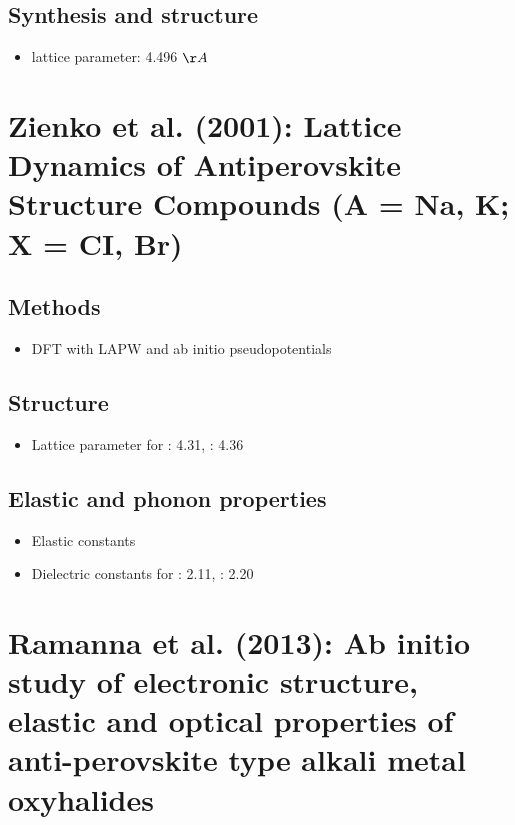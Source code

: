 \documentclass[10pt,a4paper, titlepage]{article}
\begin{document}
\subsection{Synthesis and structure}

\begin{itemize}
  \item {} lattice parameter: 4.496 $\AA$
\end{itemize}

\section{Zienko et al. (2001): Lattice Dynamics of Antiperovskite Structure
Compounds  (A = Na, K; X = CI, Br)}

\subsection{Methods}

\begin{itemize}
  \item DFT with LAPW and ab initio pseudopotentials
\end{itemize}

\subsection{Structure}

\begin{itemize}
  \item Lattice parameter for : 4.31, : 4.36
\end{itemize}

\subsection{Elastic and phonon properties}

\begin{itemize}
  \item Elastic constants
  \item Dielectric constants for : 2.11, : 2.20
\end{itemize}

\section{Ramanna et al. (2013): Ab initio study of electronic structure, elastic and optical properties of anti-perovskite type alkali metal oxyhalides}
\end{document}
